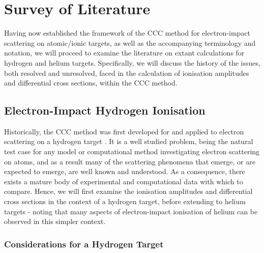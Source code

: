 \documentclass[draft]{article}
\begin{document}
\section{Survey of Literature}
\label{sec:survey-literature}

Having now established the framework of the CCC method for electron-impact
scattering on atomic/ionic targets, as well as the accompanying terminology and
notation, we will proceed to examine the literature on extant calculations for
hydrogen and helium targets.
Specifically, we will discuss the history of the issues, both resolved and
unresolved, faced in the calculation of ionisation amplitudes and differential
cross sections, within the CCC method.

\subsection{Electron-Impact Hydrogen Ionisation}
\label{sec:e-h-ionisation}

Historically, the CCC method was first developed for and applied to electron
scattering on a hydrogen target \cite{PhysRevA.46.6995}.
It is a well studied problem, being the natural test case for any model or
computational method investigating electron scattering on atoms, and as a result
many of the scattering phenomena that emerge, or are expected to emerge, are
well known and understood.
As a consequence, there exists a mature body of experimental and computational
data with which to compare.
Hence, we will first examine the ionisation amplitudes and differential cross
sections in the context of a hydrogen target, before extending to helium
targets - noting that many aspects of electron-impact ionisation of helium can
be observed in this simpler context.

\subsubsection{Considerations for a Hydrogen Target}
\label{sec:e-h-target}
\end{document}
